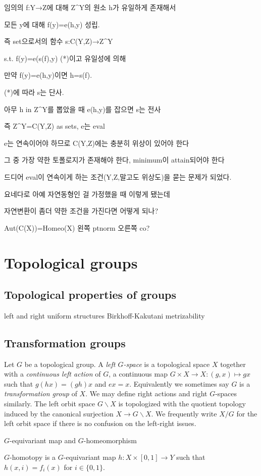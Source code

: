 \documentclass{../../large}
\begin{document}
임의의 f:Y→Z에 대해 Z^Y의 원소 h가 유일하게 존재해서

모든 y에 대해 f(y)=e(h,y) 성립.

즉 set으로서의 함수 s:C(Y,Z)→Z^Y

s.t. f(y)=e(s(f),y) (*)이고 유일성에 의해

만약 f(y)=e(h,y)이면 h=s(f).

(*)에 따라 s는 단사.

아무 h in Z^Y를 뽑았을 때 e(h,y)를 잡으면 s는 전사

즉 Z^Y=C(Y,Z) as sets, e는 eval

e는 연속이어야 하므로 C(Y,Z)에는 충분히 위상이 있어야 한다

그 중 가장 약한 토폴로지가 존재해야 한다, minimum이 attain되어야 한다

드디어 eval이 연속이게 하는 조건(Y,Z,말고도 위상도)을 묻는 문제가 되었다.

요네다로 아예 자연동형인 걸 가정했을 때 이렇게 됐는데

자연변환이 좀더 약한 조건을 가진다면 어떻게 되나?

Aut(C(X))=Homeo(X) 왼쪽 ptnorm 오른쪽 co?

\fi

\chapter{Topological groups}

\section{Topological properties of groups}
left and right uniform structures
Birkhoff-Kakutani
metrizability

\section{Transformation groups}

\begin{prb}
Let $G$ be a topological group.
A \emph{left $G$-space} is a topological space $X$ together with a \emph{continuous left action} of $G$, a continuous map $G\times X\to X:(g,x)\mapsto gx$ such that $g(hx)=(gh)x$ and $ex=x$.
Equivalently we sometimes say $G$ is a \emph{transformation group} of $X$.
We may define right actions and right $G$-spaces similarly.
The left orbit space $G\backslash X$ is topologized with the quotient topology induced by the canonical surjection $X\to G\backslash X$.
We frequently write $X/G$ for the left orbit space if there is no confusion on the left-right issues.

$G$-equivariant map and $G$-homeomorphism

$G$-homotopy is a $G$-equivariant map $h:X\times[0,1]\to Y$ such that $h(x,i)=f_i(x)$ for $i\in\{0,1\}$.
\end{prb}
\end{document}
